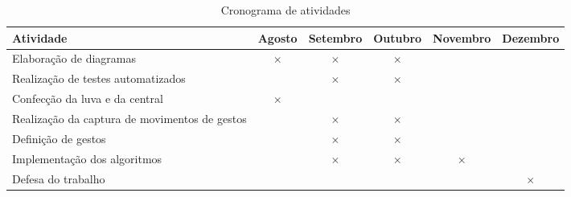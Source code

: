 \label{chapter:cronograma}

\begin{table}[htbp]
  \centering
  \caption{Cronograma de atividades}
  \label{tab:cronograma}
  \begin{tabularx}{\textwidth}{|X|c|c|c|c|c|}
    \hline
    \textbf{Atividade} & \textbf{Agosto} & \textbf{Setembro} & \textbf{Outubro} & \textbf{Novembro} & \textbf{Dezembro} \\
    \hline
    Elaboração de diagramas & \(\times\) & \(\times\) & \(\times\) & & \\
    \hline
    Realização de testes automatizados &  & \(\times\) &  \(\times\) & & \\
    \hline
    Confecção da luva e da central & \(\times\) & & & & \\
    \hline
    Realização da captura de movimentos de gestos & & \(\times\) & \(\times\) & &  \\
    \hline
    Definição de gestos & & \(\times\) & \(\times\)  & &  \\
    \hline
    Implementação dos algoritmos & & \(\times\) & \(\times\)  & \(\times\) & \\
    \hline
    Defesa do trabalho & & & &  & \(\times\) \\
    \hline
  \end{tabularx}
\end{table}